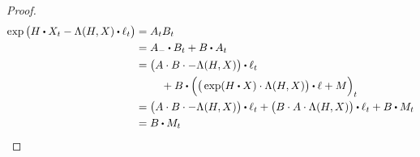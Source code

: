 \begin{proof}
  \begin{align*}
    \exp\big( H \shortInt \X_t - \ode(H, \X) \shortInt \leb_t \big) 
    &= A_t B_t \\
    &= A_- \shortInt B_t + B \shortInt A_t \\
    &= \begin{aligned}[t]
      &\big( A \cdot B \cdot -\ode(H, \X) \big) \shortInt \leb_t \\
      &\quad+ B \shortInt \Big( \big( \exp( H \shortInt \X ) \cdot \ode(H, \X) \big) \shortInt \leb + M \Big)_t 
    \end{aligned} \\
    &= \big( A \cdot B \cdot -\ode(H, \X) \big) \shortInt \leb_t + \big( B \cdot A \cdot \ode(H, \X) \big) \shortInt \leb_t + B \shortInt M_t \\
    &= B \shortInt M_t
  \end{align*}
\end{proof}
